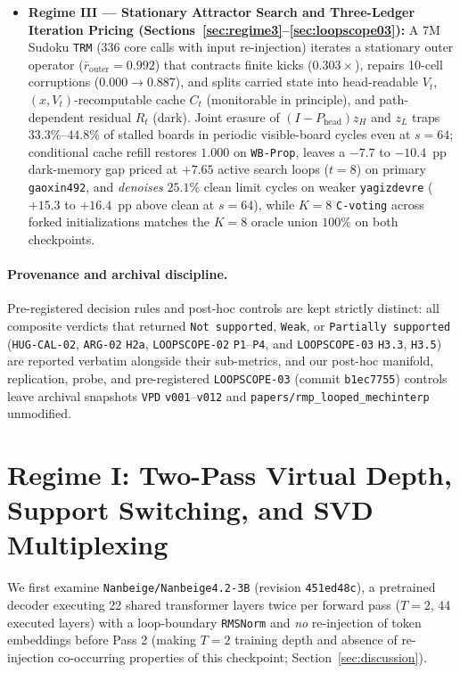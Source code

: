 \documentclass[10pt,letterpaper]{article}
\newcommand{\Phead}{P_{\mathrm{head}}}
\begin{document}
\begin{itemize}
  \item \textbf{Regime III — Stationary Attractor Search and Three-Ledger Iteration Pricing (Sections~\ref{sec:regime3}--\ref{sec:loopscope03}):} A 7M Sudoku \texttt{TRM} (336 core calls with input re-injection) iterates a stationary outer operator ($\bar{r}_{\mathrm{outer}}=0.992$) that contracts finite kicks ($0.303\times$), repairs 10-cell corruptions ($0.000 \to 0.887$), and splits carried state into head-readable $V_t$, $(x,V_t)$-recomputable cache $C_t$ (monitorable in principle), and path-dependent residual $R_t$ (dark). Joint erasure of $(I-\Phead)z_H$ and $z_L$ traps $33.3\%$--$44.8\%$ of stalled boards in periodic visible-board cycles even at $s=64$; conditional cache refill restores $1.000$ on \texttt{WB-Prop}, leaves a $-7.7$ to $-10.4$~pp dark-memory gap priced at $+7.65$ active search loops ($t=8$) on primary \texttt{gaoxin492}, and \emph{denoises} $25.1\%$ clean limit cycles on weaker \texttt{yagizdevre} ($+15.3$ to $+16.4$~pp above clean at $s=64$), while $K=8$ \texttt{C-voting} across forked initializations matches the $K=8$ oracle union $100\%$ on both checkpoints.
\end{itemize}

\paragraph{Provenance and archival discipline.} Pre-registered decision rules and post-hoc controls are kept strictly distinct: all composite verdicts that returned \texttt{Not supported}, \texttt{Weak}, or \texttt{Partially supported} (\texttt{HUG-CAL-02}, \texttt{ARG-02} \texttt{H2a}, \texttt{LOOPSCOPE-02} \texttt{P1}--\texttt{P4}, and \texttt{LOOPSCOPE-03} \texttt{H3.3}, \texttt{H3.5}) are reported verbatim alongside their sub-metrics, and our post-hoc manifold, replication, probe, and pre-registered \texttt{LOOPSCOPE-03} (commit \texttt{b1ec7755}) controls leave archival snapshots \texttt{VPD} \texttt{v001}--\texttt{v012} and \texttt{papers/rmp\_looped\_mechinterp} unmodified.

\section{Regime I: Two-Pass Virtual Depth, Support Switching, and SVD Multiplexing}\label{sec:regime1}

We first examine \texttt{Nanbeige/Nanbeige4.2-3B} \cite{nanbeige2026model} (revision \texttt{451ed48c}), a pretrained decoder executing 22 shared transformer layers twice per forward pass ($T=2$, 44 executed layers) with a loop-boundary \texttt{RMSNorm} and \emph{no} re-injection of token embeddings before Pass 2 (making $T=2$ training depth and absence of re-injection co-occurring properties of this checkpoint; Section~\ref{sec:discussion}).
\end{document}
